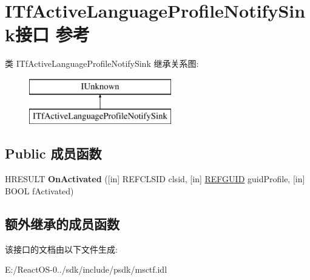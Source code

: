 \hypertarget{interface_i_tf_active_language_profile_notify_sink}{}\section{I\+Tf\+Active\+Language\+Profile\+Notify\+Sink接口 参考}
\label{interface_i_tf_active_language_profile_notify_sink}
类 I\+Tf\+Active\+Language\+Profile\+Notify\+Sink 继承关系图\+:\begin{figure}[H]
\begin{center}
\leavevmode
\includegraphics[height=2.000000cm]{interface_i_tf_active_language_profile_notify_sink}
\end{center}
\end{figure}
\subsection*{Public 成员函数}
\begin{DoxyCompactItemize}
\item 
\mbox{\label{interface_i_tf_active_language_profile_notify_sink_a32ff476904d896737a5fab3e24a28c49}} 
H\+R\+E\+S\+U\+LT {\bfseries On\+Activated} (\mbox{[}in\mbox{]} R\+E\+F\+C\+L\+S\+ID clsid, \mbox{[}in\mbox{]} \hyperlink{struct___g_u_i_d}{R\+E\+F\+G\+U\+ID} guid\+Profile, \mbox{[}in\mbox{]} B\+O\+OL f\+Activated)
\end{DoxyCompactItemize}
\subsection*{额外继承的成员函数}


该接口的文档由以下文件生成\+:\begin{DoxyCompactItemize}
\item 
E\+:/\+React\+O\+S-\/0../sdk/include/psdk/msctf.\+idl\end{DoxyCompactItemize}
